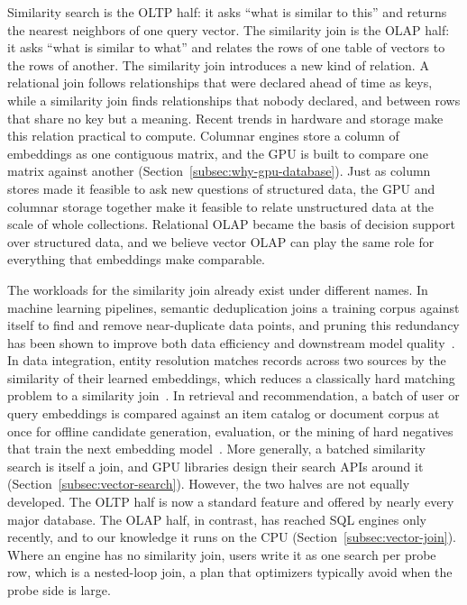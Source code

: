Similarity search is the OLTP half: it asks ``what is similar to this'' and returns the nearest neighbors of one query vector.
The similarity join is the OLAP half: it asks ``what is similar to what'' and relates the rows of one table of vectors to the rows of another.
The similarity join introduces a new kind of relation.
A relational join follows relationships that were declared ahead of time as keys, while a similarity join finds relationships that nobody declared, and between rows that share no key but a meaning.
Recent trends in hardware and storage make this relation practical to compute.
Columnar engines store a column of embeddings as one contiguous matrix, and the GPU is built to compare one matrix against another (Section~\ref{subsec:why-gpu-database}).
Just as column stores made it feasible to ask new questions of structured data, the GPU and columnar storage together make it feasible to relate unstructured data at the scale of whole collections.
Relational OLAP became the basis of decision support over structured data, and we believe vector OLAP can play the same role for everything that embeddings make comparable.

The workloads for the similarity join already exist under different names.
In machine learning pipelines, semantic deduplication joins a training corpus against itself to find and remove near-duplicate data points, and pruning this redundancy has been shown to improve both data efficiency and downstream model quality~\cite{HuSieveIVF26, AbbasSemDeDup23}.
In data integration, entity resolution matches records across two sources by the similarity of their learned embeddings, which reduces a classically hard matching problem to a similarity join~\cite{SantanaEMJoin25, SantanaRibeiro23}.
In retrieval and recommendation, a batch of user or query embeddings is compared against an item catalog or document corpus at once for offline candidate generation, evaluation, or the mining of hard negatives that train the next embedding model~\cite{HuangFBRetrieval20, XiongANCE21, ThakurBEIR21}.
More generally, a batched similarity search is itself a join, and GPU libraries design their search APIs around it (Section~\ref{subsec:vector-search}).
However, the two halves are not equally developed.
The OLTP half is now a standard feature and offered by nearly every major database.
The OLAP half, in contrast, has reached SQL engines only recently, and to our knowledge it runs on the CPU (Section~\ref{subsec:vector-join}).
Where an engine has no similarity join, users write it as one search per probe row, which is a nested-loop join, a plan that optimizers typically avoid when the probe side is large.

